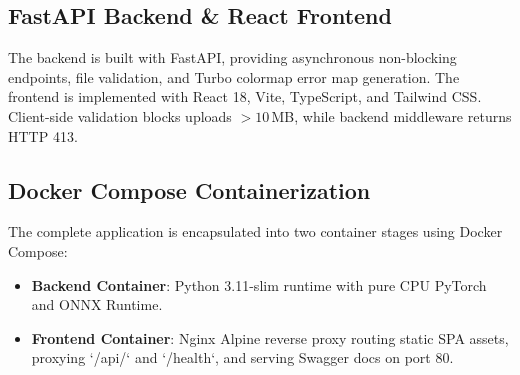 \documentclass[conference]{IEEEtran}
\begin{document}
\begin{table}[ht]
\caption{Production ONNX Model Metrics and Pure CPU Inference Latency ($128\times 128$, Batch Size = 1)}
\label{tab:onnx_benchmark}
\centering
{}
\end{table}

\subsection{FastAPI Backend \& React Frontend}
The backend is built with FastAPI, providing asynchronous non-blocking endpoints, file validation, and Turbo colormap error map generation. The frontend is implemented with React 18, Vite, TypeScript, and Tailwind CSS. Client-side validation blocks uploads $>10$\,MB, while backend middleware returns HTTP 413.

\subsection{Docker Compose Containerization}
The complete application is encapsulated into two container stages using Docker Compose:
\begin{itemize}
    \item \textbf{Backend Container}: Python 3.11-slim runtime with pure CPU PyTorch and ONNX Runtime.
    \item \textbf{Frontend Container}: Nginx Alpine reverse proxy routing static SPA assets, proxying `/api/` and `/health`, and serving Swagger docs on port 80.
\end{itemize}
\end{document}
